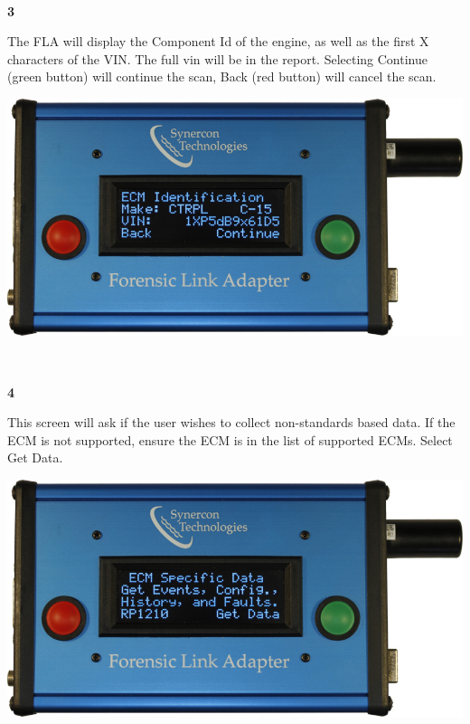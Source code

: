 \documentclass[11pt]{article}
\begin{document}
\\[\baselineskip]
\noindent\begin{minipage}{0.3\textwidth}%
\begin{center}
\textbf{3}\\[\baselineskip]
\end{center}
The FLA will display the Component Id of the engine, as well as the first X characters of the VIN. The full vin will be in the report. Selecting Continue (green button) will continue the scan, Back (red button) will cancel the scan.
\end{minipage}%
\hfill%
\begin{minipage}{0.6\textwidth}
\includegraphics[width=\linewidth]{../../media/fla_screens/ethernet_and_others/veh_scan/comp_id}
\end{minipage}
\\[\baselineskip]
\noindent\begin{minipage}{0.3\textwidth}%
\begin{center}
\textbf{4}\\[\baselineskip]
\end{center}
This screen will ask if the user wishes to collect non-standards based data. If the ECM is not supported, ensure the ECM is in the list of supported ECMs. Select Get Data.
\end{minipage}%
\hfill%
\begin{minipage}{0.6\textwidth}
\includegraphics[width=\linewidth]{../../media/fla_screens/ethernet_and_others/veh_scan/get_ecm_specific}
\end{minipage}
\end{document}

